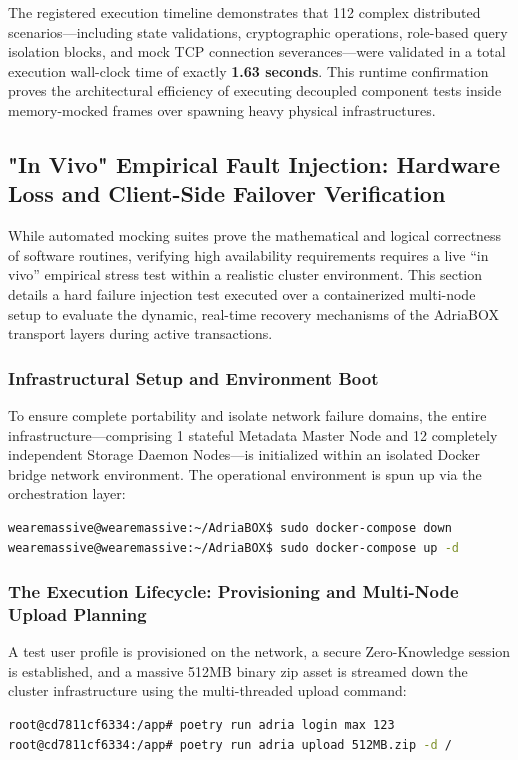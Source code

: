 The registered execution timeline demonstrates that 112 complex distributed scenarios—including state validations, cryptographic operations, role-based query isolation blocks, and mock TCP connection severances—were validated in a total execution wall-clock time of exactly \textbf{1.63 seconds}. This runtime confirmation proves the architectural efficiency of executing decoupled component tests inside memory-mocked frames over spawning heavy physical infrastructures.

\subsection{"In Vivo" Empirical Fault Injection: Hardware Loss and Client-Side Failover Verification}
While automated mocking suites prove the mathematical and logical correctness of software routines, verifying high availability requirements requires a live ``in vivo'' empirical stress test within a realistic cluster environment. This section details a hard failure injection test executed over a containerized multi-node setup to evaluate the dynamic, real-time recovery mechanisms of the AdriaBOX transport layers during active transactions.

\subsubsection{Infrastructural Setup and Environment Boot}
To ensure complete portability and isolate network failure domains, the entire infrastructure—comprising 1 stateful Metadata Master Node and 12 completely independent Storage Daemon Nodes—is initialized within an isolated Docker bridge network environment. The operational environment is spun up via the orchestration layer:
\begin{lstlisting}[language=bash]
wearemassive@wearemassive:~/AdriaBOX$ sudo docker-compose down
wearemassive@wearemassive:~/AdriaBOX$ sudo docker-compose up -d
\end{lstlisting}

\subsubsection{The Execution Lifecycle: Provisioning and Multi-Node Upload Planning}
A test user profile is provisioned on the network, a secure Zero-Knowledge session is established, and a massive 512MB binary zip asset is streamed down the cluster infrastructure using the multi-threaded upload command:
\begin{lstlisting}[language=bash]
root@cd7811cf6334:/app# poetry run adria login max 123
root@cd7811cf6334:/app# poetry run adria upload 512MB.zip -d /
\end{lstlisting}

